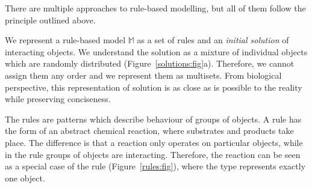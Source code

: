 \documentclass[12pt, twoside]{fithesis2} %
\begin{document}
There are multiple approaches to rule-based modelling, but all of them follow the principle outlined above.

We represent a rule-based model $\mathds{M}$ as a set of rules and an \emph{initial solution} of interacting objects. We understand the solution as a mixture of individual objects which are randomly distributed (Figure~\ref{solutions:fig}a). Therefore, we cannot assign them any order and we represent them as multisets. From biological perspective, this representation of solution is as close as is possible to the reality while preserving conciseness.

The rules are patterns which describe behaviour of groups of objects. A rule has the form of an abstract chemical reaction, where substrates and products take place. The difference is that a reaction only operates on particular objects, while in the rule groups of objects are interacting. Therefore, the reaction can be seen as a special case of the rule (Figure~\ref{rules:fig}), where the type represents exactly one object.
\end{document}
